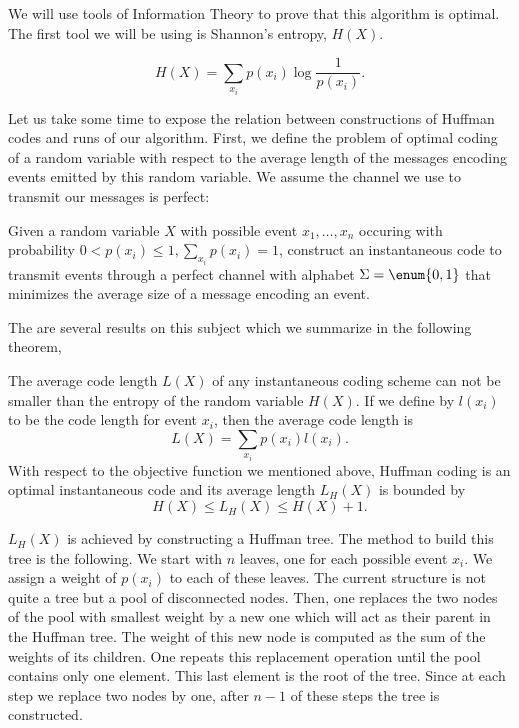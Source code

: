 We will use tools of Information Theory to prove that this algorithm is
optimal. The first tool we will be using is Shannon's entropy, \(H(X)\).
\begin{theorem}
\begin{displaymath}
H(X) = \sum_{x_i} p(x_i) \log \frac{1}{p(x_i)}.
\end{displaymath}
\end{theorem}

Let us take some time to expose the relation between constructions of Huffman
codes and runs of our algorithm. First, we define the problem of optimal
coding of a random variable with respect to the average length of the messages
encoding events emitted by this random variable. We assume the channel we
use to transmit our messages is perfect:

\begin{problem}
Given a random variable \(X\) with possible event \(x_1,\ldots,x_n\) occuring
with probability \(0 < p(x_i) \le 1, \sum_{x_i} p(x_i) = 1\), construct an
instantaneous code to transmit events through a perfect channel with alphabet
\(\Sigma = \enum{0,1}\) that minimizes the average size of a message encoding
an event.
\end{problem}

The are several results on this subject which we summarize in the
following theorem,

\begin{theorem}
The average code length \(L(X)\) of any instantaneous coding scheme can not be smaller than
the entropy of the random variable \(H(X)\). If we define by \(l(x_i)\) to be the code
length for event \(x_i\), then the average code length is
\begin{displaymath}
L(X) = \sum_{x_i} p(x_i) l(x_i).
\end{displaymath}
With respect to the objective function we mentioned above, Huffman coding is
an optimal instantaneous code and its average length \(L_H(X)\) is bounded by
\begin{displaymath}
H(X) \le L_H(X) \le H(X) + 1.
\end{displaymath}
\end{theorem}

\(L_H(X)\) is achieved by constructing a Huffman tree. The method to build this
tree is the following. We start with \(n\) leaves, one for each possible event
\(x_i\). We assign a weight of \(p(x_i)\) to each of these leaves. The current
structure is not quite a tree but a pool of disconnected nodes.  Then, one
replaces the two nodes of the pool with smallest weight by a new one which will
act as their parent in the Huffman tree. The weight of this new node is
computed as the sum of the weights of its children. One repeats this
replacement operation until the pool contains only one element. This last
element is the root of the tree. Since at each step we replace two nodes by
one, after \(n-1\) of these steps the tree is constructed.

